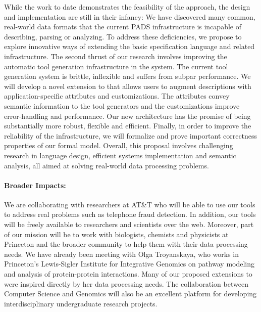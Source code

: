 While the work to date demonstrates the feasibility of the \pads{}
approach, the \pads{} design and implementation are still in their infancy:
We have discovered many common, real-world data formats that the current PADS 
infrastructure is incapable of describing, parsing or analyzing. 
To address these deficiencies, we propose to explore innovative ways
of extending the basic \pads{} specification language and related
infrastructure.  The second thrust of our research involves
improving the automatic tool generation infrastructure in the \pads{} system.
The current tool generation system is brittle, inflexible and suffers from
subpar performance.  We will develop a novel extension to \pads{} 
that allows users to augment \pads{} descriptions with application-specific
attributes and customizations.  The attributes convey semantic information to
the tool generators and the customizations improve error-handling
and performance.  Our new architecture has the promise of being
substantially more robust, flexible and efficient.
Finally, in order to improve the reliability of the infrastructure,
we will formalize \pads{} and prove important correctness properties
of our formal model.  Overall, this proposal involves challenging research in
language design, efficient systems implementation and
semantic analysis, all aimed at solving real-world data processing 
problems.

\paragraph*{Broader Impacts:}  We are collaborating with researchers at
AT\&T who will be able to use our tools to address real problems such as
telephone fraud detection.  In addition, our tools will be 
freely available to researchers and scientists over the web.  
Moreover, part of our mission will be to work with 
biologists, chemists and physicists at Princeton and the broader community
to help them with their data 
processing needs.  We have already been meeting with Olga Troyanskaya,
who works in Princeton's Lewis-Sigler Institute for Integrative Genomics 
on pathway modeling and analysis of protein-protein interactions.  Many of our proposed
extensions to \pads{} were inspired directly by her data processing needs.
The collaboration between Computer Science and Genomics will also be an excellent platform
for developing interdisciplinary undergraduate research projects.
